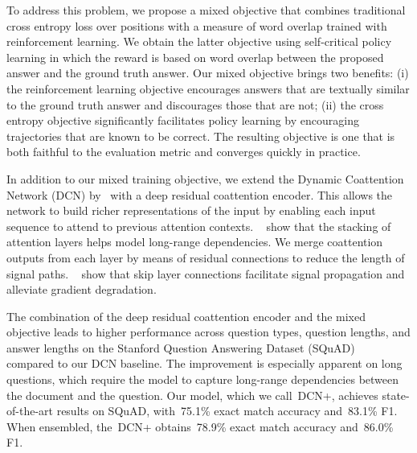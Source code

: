 \documentclass{article} \usepackage{iclr2018_conference,times}
\newcommand{\modelname}{DCN+\xspace}
\newcommand{\squad}{SQuAD\xspace}
\newcommand{\emours}{75.1\%\xspace}
\newcommand{\fours}{83.1\%\xspace}
\newcommand{\emoursensemble}{78.9\%\xspace}
\newcommand{\foursensemble}{86.0\%\xspace}
\begin{document}
To address this problem, we propose a mixed objective that combines traditional cross entropy loss over positions with a measure of word overlap trained with reinforcement learning.
We obtain the latter objective using self-critical policy learning in which the reward is based on word overlap between the proposed answer and the ground truth answer.
Our mixed objective brings two benefits: 
(i) the reinforcement learning objective encourages answers that are textually similar to the ground truth answer and discourages those that are not;
(ii) the cross entropy objective significantly facilitates policy learning by encouraging trajectories that are known to be correct.
The resulting objective is one that is both faithful to the evaluation metric and converges quickly in practice.

In addition to our mixed training objective, we extend the Dynamic Coattention Network (DCN) by~\citet{xiong2016dynamic} with a deep residual coattention encoder.
This allows the network to build richer representations of the input by enabling each input sequence to attend to previous attention contexts.
~\citet{Vaswani2017AttentionIA} show that the stacking of attention layers helps model long-range dependencies.
We merge coattention outputs from each layer by means of residual connections to reduce the length of signal paths.
~\citet{He2016DeepRL} show that skip layer connections facilitate signal propagation and alleviate gradient degradation.

The combination of the deep residual coattention encoder and the mixed objective leads to higher performance across question types, question lengths, and answer lengths on the Stanford Question Answering Dataset (\squad)~\citep{Rajpurkar2016SQuAD10} compared to our DCN baseline.
The improvement is especially apparent on long questions, which require the model to capture long-range dependencies between the document and the question.
Our model, which we call~\modelname, achieves state-of-the-art results on \squad, with~\emours exact match accuracy and~\fours F1.
When ensembled, the~\modelname obtains~\emoursensemble exact match accuracy and~\foursensemble F1.

 
 
 
 



 
\end{document}

